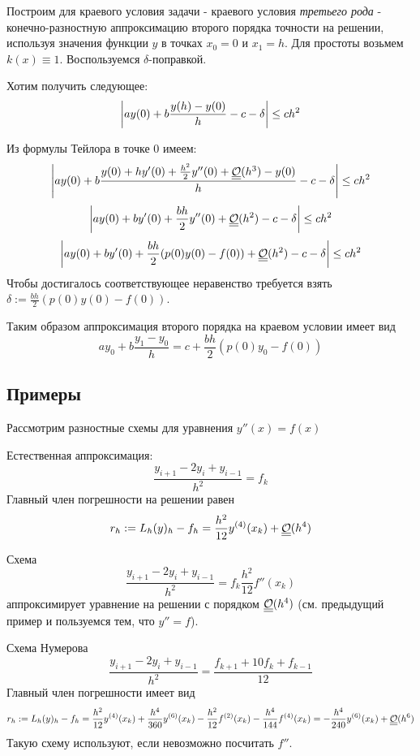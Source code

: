 Построим для краевого условия задачи - краевого условия \textit{третьего рода} -
конечно-разностную аппроксимацию второго порядка точности на решении,
используя значения функции $y$ в точках $x_0=0$ и $x_1=h$.
Для простоты возьмем $k(x)\equiv1$. Воспользуемся $\delta$-поправкой.

Хотим получить следующее:
\[\left\lvert ay(0)+b\frac{y(h)-y(0)}{h}-c-\delta\right\rvert\leq ch^2\]

Из формулы Тейлора в точке $0$ имеем:
\[\left\lvert ay(0)+b\frac{y(0)+hy'(0)+\frac{h^2}{2}y''(0)+\underline{\underline{\mathcal{O}}}(h^3)-y(0)}{h}-c-\delta\right\rvert\leq ch^2\]
\[\left\lvert ay(0)+by'(0)+\frac{bh}{2}y''(0)+\underline{\underline{\mathcal{O}}}(h^2)-c-\delta\right\rvert\leq ch^2\]
\[\left\lvert ay(0)+by'(0)+\frac{bh}{2}(p(0)y(0)-f(0))+\underline{\underline{\mathcal{O}}}(h^2)-c-\delta\right\rvert\leq ch^2\]
Чтобы достигалось соответствующее неравенство
требуется взять $\delta:=\frac{bh}{2}(p(0)y(0)-f(0))$.

Таким образом аппроксимация второго порядка на краевом условии имеет вид
\[ay_0+b\frac{y_1-y_0}{h}=c+\frac{bh}{2}(p(0)y_0-f(0))\]

\subsection*{Примеры}
Рассмотрим разностные схемы для уравнения $y''(x)=f(x)$
\begin{example}
  Естественная аппроксимация:
  \[\frac{y_{i+1}-2y_i+y_{i-1}}{h^2}=f_k\]
  Главный член погрешности на решении равен
  \[r_h:=L_h(y)_h-f_h=\frac{h^2}{12}y^{(4)}(x_k)+\underline{\underline{\mathcal{O}}}(h^4)\]
\end{example}
\begin{example}
  Схема
  \[\frac{y_{i+1}-2y_i+y_{i-1}}{h^2}=f_k\frac{h^2}{12}f''(x_k)\]
  аппроксимирует уравнение на решении с порядком $\underline{\underline{\mathcal{O}}}(h^4)$
  (см. предыдущий пример и пользуемся тем, что $y''=f$).
\end{example}
\begin{example}
  Схема Нумерова
  \[\frac{y_{i+1}-2y_i+y_{i-1}}{h^2}=\frac{f_{k+1}+10f_k+f_{k-1}}{12}\]
  Главный член погрешности имеет вид
  \[r_h:=L_h(y)_h-f_h=\frac{h^2}{12}y^{(4)}(x_k)+\frac{h^4}{360}y^{(6)}(x_k)-\frac{h^2}{12}f^{(2)}(x_k)-\frac{h^4}{144}f^{(4)}(x_k)=-\frac{h^4}{240}y^{(6)}(x_k)+\underline{\underline{\mathcal{O}}}(h^6)\]
  Такую схему используют, если невозможно посчитать $f''$.
\end{example}
